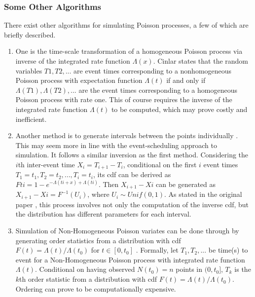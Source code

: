 \documentclass[%
 reprint,
 amsmath,amssymb,
 aps,
]{revtex4-2}
\theoremstyle{definition}
\begin{document}
\subsubsection{Some Other Algorithms}
There exist other algorithms for simulating Poisson processes, a few of which are briefly described.
\begin{enumerate}
\item One is the time-scale transformation of a homogeneous Poisson process via inverse of the integrated rate function $\Lambda(x)$. Cinlar \cite{cinlar1975introduction} states that the random variables $T1, T2, . . .$ are event times corresponding to a nonhomogeneous Poisson process with expectation function $\Lambda(t)$ if and only if $\Lambda(T1),\Lambda(T2), . . .$ are the event times corresponding to a homogeneous Poisson process with rate one. This of course requires the inverse of the integrated rate function $\Lambda(t)$ to be computed, which may prove costly and inefficient.

\item Another method is to generate intervals between the points individually \cite{pasupathy}. This may seem more in line with the event-scheduling approach to simulation. It follows a similar inversion as the first method. Considering the $i$th inter-event time $X_i = T_{i+1} - T_i$, conditional on the first $i$ event times $T_1 = t_1, T_2 = t_2, . . . , T_i = t_i$, its cdf can be derived as $Fti = 1 - e^{-\Lambda(ti + x) + \Lambda(ti)}$. Then $X_{i+1} - X{i}$ can be generated as $X_{i+1} - X{i} = F^{-1}(U_i)$, where $U_i \sim Unif(0,1)$. As stated in the original paper \cite{lewis_shedler_1979}, this process involves not only the computation of the inverse cdf, but the distribution has different parameters for each interval.

\item Simulation of Non-Homogeneous Poisson variates can be done through by generating order statistics from a distribution with cdf $F(t) = \Lambda(t)/\Lambda(t_0)$ for $t\in [0,t_0]$ \cite{lewis_shedler_1976}. Formally, let $T_1 , T_2 , ...$ be time(s) to event for a Non-Homogeneous Poisson process with integrated rate function $\Lambda(t)$. Conditional on having observed $N(t_0) = n$ points in $(0,t_0]$, $T_k$ is the $k$th order statistic from a distribution with cdf $F(t) = \Lambda(t) / \Lambda(t_0)$. Ordering can prove to be computationally expensive.
\end{enumerate}
\end{document}
